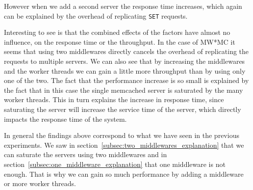 \documentclass[11pt,a4paper]{article}
\begin{document}
%
However when we add a second server the response time increases, which again can be explained by the overhead of replicating \texttt{SET} requests.
%
\par
%
Interesting to see is that the combined effects of the factors have almost no influence, on the response time or the throughput.
%
In the case of MW*MC it seems that using two middlewares directly cancels the overhead of replicating the requests to multiple servers.
%
We can also see that by increasing the middlewares and the worker threads we can gain a little more throughput than by using only one of the two.
%
The fact that the performance increase is so small is explained by the fact that in this case the single memcached server is saturated by the many worker threads.
%
This in turn explains the increase in response time, since saturating the server will increase the service time of the server, which directly impacts the response time of the system.
%
\par
%
In general the findings above correspond to what we have seen in the previous experiments.
%
We saw in section~\ref{subsec:two_middlewares_explanation} that we can saturate the servers using two middlewares and in section~\ref{subsec:one_middleware_explanation} that one middleware is not enough.
%
That is why we can gain so much performance by adding a middleware or more worker threads.
%
\end{document}
